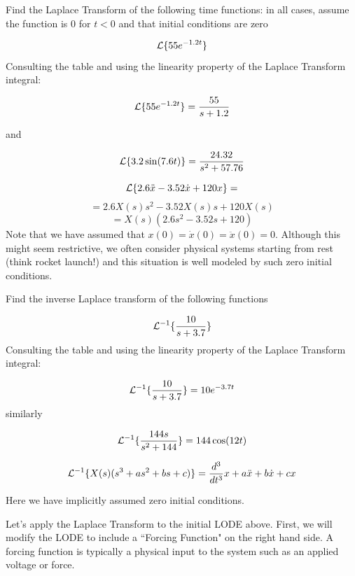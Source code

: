 \begin{ExampleSmall}
Find the Laplace Transform of the following time functions:  in all cases, assume the function is $0$ for $t<0$ and that initial conditions are zero

\vspace{0.2in}

\[
\mathcal{L}\{55e^{-1.2t}\}
\]
Consulting the table and using the linearity property of the Laplace Transform integral:

\[
\mathcal{L}\{55e^{-1.2t}\} = \frac {55} {s+1.2}
\]

\vspace{0.2in}
and

\[
\mathcal{L}\{ 3.2\sin(7.6t) \} = \frac {24.32}{s^2 + 57.76}
\]
\vspace{0.2in}


\[
\mathcal{L}\{ 2.6\ddot{x} - 3.52\dot{x} + 120x \} =
\]
\[
= 2.6X(s)s^2-3.52X(s)s+120X(s)
\]
\[
= X(s) \left(2.6s^2 - 3.52s + 120 \right)
\]
Note that we have assumed that $x(0) = \dot{x}(0) = \ddot{x}(0) = 0$.   Although this might seem restrictive, we often consider physical systems starting from rest (think rocket launch!) and this situation is well modeled by such zero initial conditions.
\end{ExampleSmall}


\begin{ExampleSmall}
Find the inverse Laplace transform of the following functions

\vspace{0.2in}

\[
\mathcal{L}^{-1}\{\frac{10}{s+3.7}  \}
\]
Consulting the table and using the linearity property of the Laplace Transform integral:


\[
\mathcal{L}^{-1}\{\frac{10}{s+3.7}  \}  = 10e^{-3.7t}
\]
\vspace{0.2in}
similarly

\[
\mathcal{L}^{-1}\{ \frac{144s}{s^2 + 144} \}  = 144\cos(12t)
\]

\vspace{0.2in}


\[
\mathcal{L}^{-1}\{ X(s)(s^3 + as^2 + bs+c) \} = \frac{d^3}{dt^3}x + a\ddot{x} + b\dot{x} + cx
\]

Here we have implicitly assumed zero initial conditions.

\end{ExampleSmall}


Let's apply the Laplace Transform to the initial LODE above.  First, we will modify the LODE to include a ``Forcing Function" on the right hand side.  A forcing function is typically a physical input to the system such as an applied voltage or force.

